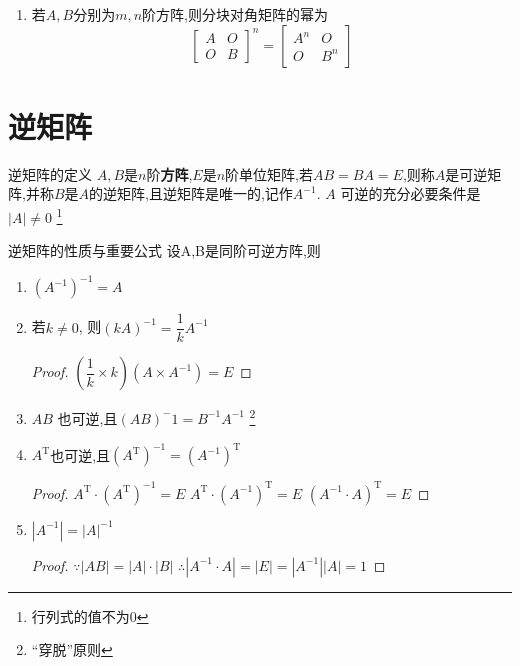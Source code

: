 \documentclass[8pt a4paper,oneside,UTF8]{ctexbook}
\begin{document}
\begin{sloppypar}
\begin{enumerate}
\begin{enumerate}
                  \item 若$A,B$分别为$m,n$阶方阵,则分块对角矩阵的幂为
                        $$\begin{bmatrix}A&O\\O&B\end{bmatrix}^n=\begin{bmatrix}A^n&O\\O&B^n\end{bmatrix}$$
              \end{enumerate}
    \end{enumerate}
    \section{逆矩阵}
    \begin{defn}{逆矩阵的定义}{}
        $A,B$是$n$阶\textbf{方阵},$E$是$n$阶单位矩阵,若$AB=BA=E$,则称$A$是可逆矩阵,并称$B$是$A$的逆矩阵,且逆矩阵是唯一的,记作$A^{-1}$.
        \tcblower
        $A$ 可逆的充分必要条件是$|A|\neq0$ \footnote{行列式的值不为0}
    \end{defn}
    \begin{criterion}{逆矩阵的性质与重要公式}{}
        设A,B是同阶可逆方阵,则
        \begin{enumerate}
            \item $(A^{-1})^{-1}=A$
            \item 若$k\neq 0$, 则$(kA)^{- 1}=\dfrac1k A^{- 1}$
                  \begin{proof}
                      $(\dfrac{1}{k} \times k) (A \times A^{-1})=E$
                  \end{proof}
            \item $AB$ 也可逆,且$(AB)^-1=B^{-1}A^{-1}$ \footnote{“穿脱”原则}
            \item $A^{\mathrm{T}}$也可逆,且$(A^{\mathrm{T} })^{-1}=(A^{- 1})^{\mathrm{T}}$
                  \begin{proof}
                      $A^{\mathrm{T}} \cdot (A^{\mathrm{T}})^{-1}=E$\newline
                      $A^{\mathrm{T}} \cdot (A^{-1})^{\mathrm{T}}=E$\newline
                      $(A^{-1}\cdot A)^{\mathrm{T}}=E$
                  \end{proof}
            \item $\left|A^{-1}\right|=\left|A\right|^{-1}$
                  \begin{proof}
                      $ \because |AB|=|A|\cdot|B|$
                      $ \therefore  |A^{-1} \cdot A|=|E|=|A^{-1}||A|=1$

\end{proof}
\end{enumerate}
\end{criterion}
\end{sloppypar}
\end{document}
